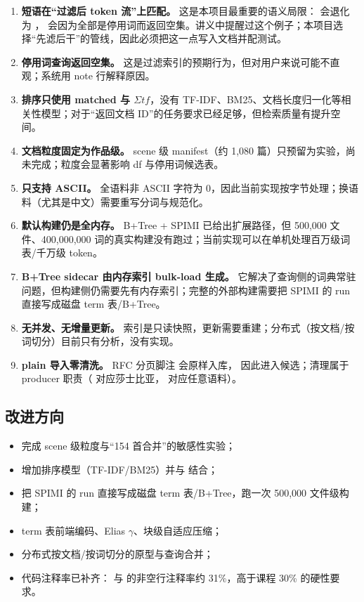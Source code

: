 \begin{enumerate}
  \item \textbf{短语在“过滤后 token 流”上匹配。} 这是本项目最重要的语义局限： 会退化为 ， 会因为全部是停用词而返回空集。讲义中提醒过这个例子；本项目选择“先滤后干”的管线，因此必须把这一点写入文档并配测试。
  \item \textbf{停用词查询返回空集。} 这是过滤索引的预期行为，但对用户来说可能不直观；系统用 note 行解释原因。
  \item \textbf{排序只使用 matched 与 $\Sigma tf$}，没有 TF-IDF、BM25、文档长度归一化等相关性模型；对于“返回文档 ID”的任务要求已经足够，但检索质量有提升空间。
  \item \textbf{文档粒度固定为作品级。} scene 级 manifest（约 1,080 篇）只预留为实验，尚未完成；粒度会显著影响 df 与停用词候选表。
  \item \textbf{只支持 ASCII。} 全语料非 ASCII 字符为 0，因此当前实现按字节处理；换语料（尤其是中文）需要重写分词与规范化。
  \item \textbf{默认构建仍是全内存。} B+Tree + SPIMI 已给出扩展路径，但 500,000 文件、400,000,000 词的真实构建没有跑过；当前实现可以在单机处理百万级词表/千万级 token。
  \item \textbf{B+Tree sidecar 由内存索引 bulk-load 生成。} 它解决了查询侧的词典常驻问题，但构建侧仍需要先有内存索引；完整的外部构建需要把 SPIMI 的 run 直接写成磁盘 term 表/B+Tree。
  \item \textbf{无并发、无增量更新。} 索引是只读快照，更新需要重建；分布式（按文档/按词切分）目前只有分析，没有实现。
  \item \textbf{plain 导入零清洗。} RFC 分页脚注 \code{[Page N]} 会原样入库， 因此进入候选；清理属于 producer 职责（ 对应莎士比亚， 对应任意语料）。
\end{enumerate}

\subsection{改进方向}

\begin{itemize}
  \item 完成 scene 级粒度与“154 首合并”的敏感性实验；
  \item 增加排序模型（TF-IDF/BM25）并与  结合；
  \item 把 SPIMI 的 run 直接写成磁盘 term 表/B+Tree，跑一次 500,000 文件级构建；
  \item term 表前端编码、Elias $\gamma$、块级自适应压缩；
  \item 分布式按文档/按词切分的原型与查询合并；
  \item 代码注释率已补齐： 与  的非空行注释率约 31\%，高于课程 30\% 的硬性要求。
\end{itemize}

